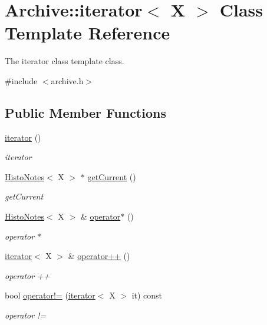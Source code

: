 \hypertarget{class_archive_1_1iterator}{}\section{Archive\+:\+:iterator$<$ X $>$ Class Template Reference}
\label{class_archive_1_1iterator}


The iterator class template class.  




{\ttfamily \#include $<$archive.\+h$>$}

\subsection*{Public Member Functions}
\begin{DoxyCompactItemize}
\item 
\mbox{\label{class_archive_1_1iterator_ae927978127c4e465b84264afcd206e0b}} 
\hyperlink{class_archive_1_1iterator_ae927978127c4e465b84264afcd206e0b}{iterator} ()
\begin{DoxyCompactList}\small\item\em iterator \end{DoxyCompactList}\item 
\hyperlink{class_histo_notes}{Histo\+Notes}$<$ X $>$ $\ast$ \hyperlink{class_archive_1_1iterator_a8f49e9bd961cd99f47cb3a7e4f434282}{get\+Current} ()
\begin{DoxyCompactList}\small\item\em get\+Current \end{DoxyCompactList}\item 
\hyperlink{class_histo_notes}{Histo\+Notes}$<$ X $>$ \& \hyperlink{class_archive_1_1iterator_add34908444ce9fda99f284e4298ffe30}{operator$\ast$} ()
\begin{DoxyCompactList}\small\item\em operator $\ast$ \end{DoxyCompactList}\item 
\hyperlink{class_archive_1_1iterator}{iterator}$<$ X $>$ \& \hyperlink{class_archive_1_1iterator_a9e6e477342ab55de2f596d6534955481}{operator++} ()
\begin{DoxyCompactList}\small\item\em operator ++ \end{DoxyCompactList}\item 
bool \hyperlink{class_archive_1_1iterator_a17c9f59d82e1001c1d7529e955b11dac}{operator!=} (\hyperlink{class_archive_1_1iterator}{iterator}$<$ X $>$ it) const
\begin{DoxyCompactList}\small\item\em operator != \end{DoxyCompactList}\end{DoxyCompactItemize}
